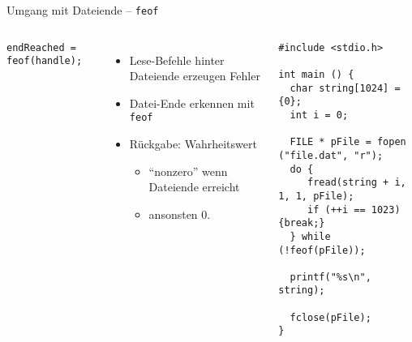 \begin{frame}[fragile]{Umgang mit Dateiende -- \texttt{feof}}
%
\vspace{-10pt}
\begin{columns}[T]
\begin{codebox}[Syntax]
\begin{verbatim}
endReached = feof(handle);
\end{verbatim}
\end{codebox}
%
\begin{itemize}
\item Lese-Befehle hinter Dateiende erzeugen Fehler
\item Datei-Ende erkennen mit \texttt{feof}
\item Rückgabe: Wahrheitswert
	\begin{itemize}
	\item \enquote{nonzero} wenn Dateiende erreicht
	\item ansonsten 0.
	\end{itemize}
\end{itemize}
%
\begin{codebox}
\begin{verbatim}
#include <stdio.h>

int main () {
  char string[1024] = {0};
  int i = 0;
  
  FILE * pFile = fopen ("file.dat", "r");
  do {
     fread(string + i, 1, 1, pFile);
     if (++i == 1023) {break;}
  } while (!feof(pFile));

  printf("%s\n", string);  
  
  fclose(pFile);
}
\end{verbatim}
\end{codebox}
\end{columns}
%
\end{frame}



